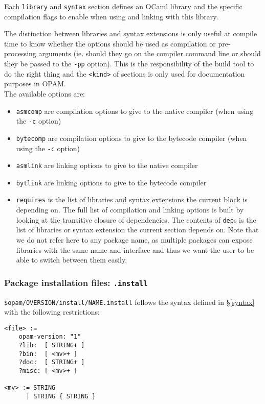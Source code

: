 \documentclass[a4paper,11pt]{article}
\begin{document}
Each {\tt library} and {\tt syntax} section defines an OCaml library
and the specific compilation flags to enable when using and linking
with this library.

The distinction between libraries and syntax extensions is only useful
at compile time to know whether the options should be used as
compilation or pre-processing arguments (ie. should they go on the
compiler command line or should they be passed to the {\tt -pp}
option). This is the responsibility of the build tool to do the right
thing and the {\tt <kind>} of sections is only used for documentation
purposes in OPAM. \\

The available options are:

\begin{itemize}
\item {\tt asmcomp} are compilation options to give to the native
  compiler (when using the {\tt -c} option)
\item {\tt bytecomp} are compilation options to give to the bytecode
  compiler (when using the {\tt -c} option)
\item {\tt asmlink} are linking options to give to the native compiler 
\item {\tt bytlink} are linking options to give to the bytecode
  compiler
\item {\tt requires} is the list of libraries and syntax extensions
  the current block is depending on. The full list of compilation
  and linking options is built by looking at the transitive closure of
  dependencies. The contents of {\tt dep}s is the list of libraries or
  syntax extension the current section depends on. Note that we do not
  refer here to any package name, as multiple packages can expose libraries
  with the same name and interface and thus we want the user to be able
  to switch between them easily.
\end{itemize}

\subsubsection{Package installation files: {\tt .install}}
\label{dotinstall}

\verb+$opam/OVERSION/install/NAME.install+ follows the syntax defined
in \S\ref{syntax} with the following restrictions:

{\small
\begin{Verbatim}[frame=single]
<file> :=
    opam-version: "1"
    ?lib:  [ STRING+ ]
    ?bin:  [ <mv>+ ]
    ?doc:  [ STRING+ ]
    ?misc: [ <mv>+ ]

<mv> := STRING
      | STRING { STRING }
\end{Verbatim}
}
\end{document}
